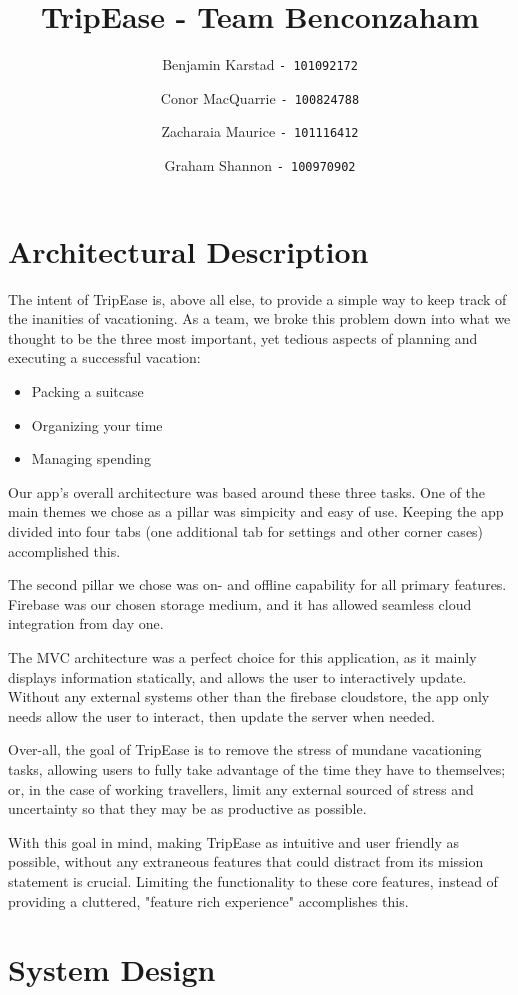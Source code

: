 \documentclass[12pt]{article}
\title{TripEase - Team Benconzaham}
\author{
Benjamin Karstad
\texttt{- 101092172}
\and
Conor MacQuarrie
\texttt{- 100824788}
\and
Zacharaia Maurice
\texttt{- 101116412}
\and
Graham Shannon
\texttt{- 100970902}
}
\begin{document}
	\maketitle
	\pagebreak
	\section*{Architectural Description}
	The intent of TripEase is, above all else, to provide a simple way to keep track of the inanities of vacationing.
	As a team, we broke this problem down into what we thought to be the three most important,
	yet tedious aspects of planning and executing a successful vacation:
	\begin{itemize}
		\item Packing a suitcase
		\item Organizing your time
		\item Managing spending
	\end{itemize}
	Our app's overall architecture was based around these three tasks.
	One of the main themes we chose as a pillar was simpicity and easy of use.
	Keeping the app divided into four tabs (one additional tab for settings and other corner cases) accomplished this.

	The second pillar we chose was on- and offline capability for all primary features.
	Firebase was our chosen storage medium, and it has allowed seamless cloud integration from day one.

	The MVC architecture was a perfect choice for this application, as it mainly displays information statically,
	and allows the user to interactively update.
	Without any external systems other than the firebase cloudstore, the app only needs allow the user to interact,
	then update the server when needed.

	Over-all, the goal of TripEase is to remove the stress of mundane vacationing tasks,
	allowing users to fully take advantage of the time they have to themselves;
	or, in the case of working travellers, limit any external sourced of stress and uncertainty
	so that they may be as productive as possible.

	With this goal in mind, making TripEase as intuitive and user friendly as possible,
	without any extraneous features that could distract from its mission statement is crucial.
	Limiting the functionality to these core features,
	instead of providing a cluttered, "feature rich experience" accomplishes this.

	\pagebreak
	\section*{System Design}
\end{document}
